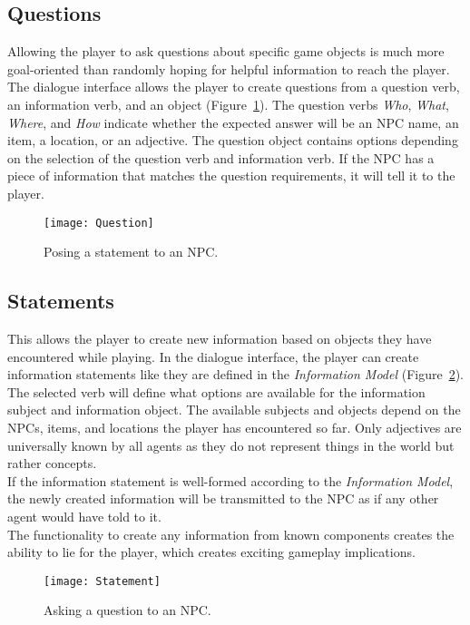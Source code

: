\subsection{Questions}
Allowing the player to ask questions about specific game objects is much more goal-oriented than randomly hoping for helpful information to reach the player. The dialogue interface allows the player to create questions from a question verb, an information verb, and an object (Figure~\ref{fig:question}). The question verbs \textit{Who}, \textit{What}, \textit{Where}, and \textit{How} indicate whether the expected answer will be an NPC name, an item, a location, or an adjective. The question object contains options depending on the selection of the question verb and information verb. If the NPC has a piece of information that matches the question requirements, it will tell it to the player.
\begin{figure}
	\centering
	\texttt{[image: Question]}
	\caption{Posing a statement to an NPC.}
	\label{fig:question}
\end{figure}
\subsection{Statements}
This allows the player to create new information based on objects they have encountered while playing. In the dialogue interface, the player can create information statements like they are defined in the \textit{Information Model} (Figure~\ref{fig:statement}). The selected verb will define what options are available for the information subject and information object. The available subjects and objects depend on the NPCs, items, and locations the player has encountered so far. Only adjectives are universally known by all agents as they do not represent things in the world but rather concepts.\\
If the information statement is well-formed according to the \textit{Information Model}, the newly created information will be transmitted to the NPC as if any other agent would have told to it.\\
The functionality to create any information from known components creates the ability to lie for the player, which creates exciting gameplay implications.
\begin{figure}
	\centering
	\texttt{[image: Statement]}
	\caption{Asking a question to an NPC.}
	\label{fig:statement}
\end{figure}
